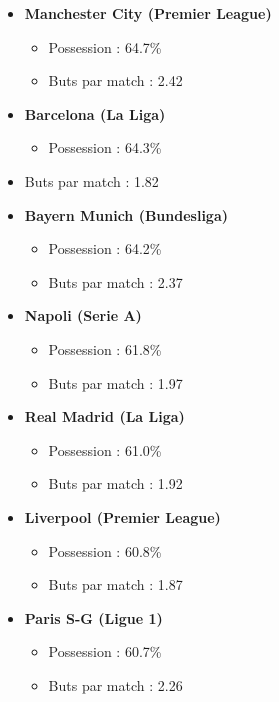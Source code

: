 \documentclass[
]{article}
\providecommand{\tightlist}{%
  \setlength{\itemsep}{0pt}\setlength{\parskip}{0pt}}
\begin{document}
\begin{itemize}
\item
  \textbf{Manchester City (Premier League)}

  \begin{itemize}
  \tightlist
  \item
    Possession : 64.7\%
  \item
    Buts par match : 2.42
  \end{itemize}
\item
  \textbf{Barcelona (La Liga)}

  \begin{itemize}
  \tightlist
  \item
    Possession : 64.3\%
  \end{itemize}
\item
  Buts par match : 1.82
\item
  \textbf{Bayern Munich (Bundesliga)}

  \begin{itemize}
  \tightlist
  \item
    Possession : 64.2\%
  \item
    Buts par match : 2.37
  \end{itemize}
\item
  \textbf{Napoli (Serie A)}

  \begin{itemize}
  \tightlist
  \item
    Possession : 61.8\%
  \item
    Buts par match : 1.97
  \end{itemize}
\item
  \textbf{Real Madrid (La Liga)}

  \begin{itemize}
  \tightlist
  \item
    Possession : 61.0\%
  \item
    Buts par match : 1.92
  \end{itemize}
\item
  \textbf{Liverpool (Premier League)}

  \begin{itemize}
  \tightlist
  \item
    Possession : 60.8\%
  \item
    Buts par match : 1.87
  \end{itemize}
\item
  \textbf{Paris S-G (Ligue 1)}

  \begin{itemize}
  \tightlist
  \item
    Possession : 60.7\%
  \item
    Buts par match : 2.26
  \end{itemize}
\end{itemize}
\end{document}
